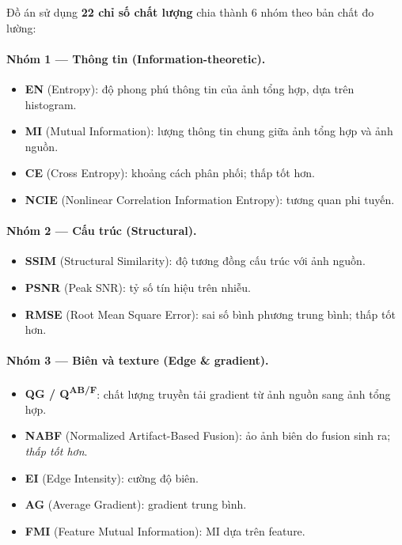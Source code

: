 Đồ án sử dụng \textbf{22 chỉ số chất lượng} chia thành 6 nhóm theo bản chất đo lường:

\paragraph{Nhóm 1 --- Thông tin (Information-theoretic).}
\begin{itemize}\itemsep0pt
    \item \textbf{EN} (Entropy): độ phong phú thông tin của ảnh tổng hợp, dựa trên histogram.
    \item \textbf{MI} (Mutual Information): lượng thông tin chung giữa ảnh tổng hợp và ảnh nguồn.
    \item \textbf{CE} (Cross Entropy): khoảng cách phân phối; thấp tốt hơn.
    \item \textbf{NCIE} (Nonlinear Correlation Information Entropy): tương quan phi tuyến.
\end{itemize}

\paragraph{Nhóm 2 --- Cấu trúc (Structural).}
\begin{itemize}\itemsep0pt
    \item \textbf{SSIM} (Structural Similarity): độ tương đồng cấu trúc với ảnh nguồn.
    \item \textbf{PSNR} (Peak SNR): tỷ số tín hiệu trên nhiễu.
    \item \textbf{RMSE} (Root Mean Square Error): sai số bình phương trung bình; thấp tốt hơn.
\end{itemize}

\paragraph{Nhóm 3 --- Biên và texture (Edge \& gradient).}
\begin{itemize}\itemsep0pt
    \item \textbf{QG / Q\textsuperscript{AB/F}}: chất lượng truyền tải gradient từ ảnh nguồn sang ảnh tổng hợp.
    \item \textbf{NABF} (Normalized Artifact-Based Fusion): ảo ảnh biên do fusion sinh ra; \emph{thấp tốt hơn}.
    \item \textbf{EI} (Edge Intensity): cường độ biên.
    \item \textbf{AG} (Average Gradient): gradient trung bình.
    \item \textbf{FMI} (Feature Mutual Information): MI dựa trên feature.
\end{itemize}


